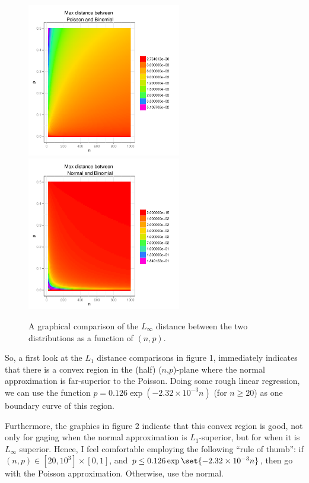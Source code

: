 \documentclass[12pt,titlepage]{article}
\begin{document}
\begin{figure}[thbp!]
\centering 
\includegraphics[width=0.6\textwidth, trim = 3mm 0mm 10mm 6mm, clip]{stat201a_hw4-plot_sup_norm_poisson.pdf} \\
\includegraphics[width=0.6\textwidth, trim = 3mm 0mm 10mm 6mm, clip]{stat201a_hw4-plot_sup_norm_normal.pdf}
\caption{A graphical comparison of the $L_{\infty}$ distance between the two distributions as a function of $(n,p)$.}
\end{figure}

So, a first look at the $L_1$ distance comparisons in figure 1, immediately indicates that there is a convex region in the (half) ($n$,$p$)-plane where the normal approximation is far-superior to the Poisson. Doing some rough linear regression, we can use the function $p = 0.126\exp(-2.32\times10^{-3}n)$ (for $n \geq 20$) as one boundary curve of this region. 

Furthermore, the graphics in figure 2 indicate that this convex region is good, not only for gaging when the normal approximation is $L_1$-superior, but for when it is $L_{\infty}$ superior. Hence, I feel comfortable employing the following ``rule of thumb'': if $(n,p) \in [20,10^{3}]\times[0,1]$, and $p \leq 0.126\exp\set{-2.32\times10^{-3} n}$, then go with the Poisson approximation. Otherwise, use the normal.
\end{document}
